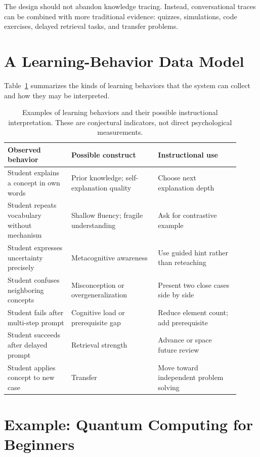 \documentclass[11pt]{article}
\begin{document}
The design should not abandon knowledge tracing. Instead, conversational traces can be combined with more traditional evidence: quizzes, simulations, code exercises, delayed retrieval tasks, and transfer problems.

\section{A Learning-Behavior Data Model}

Table~\ref{tab:data-model} summarizes the kinds of learning behaviors that the system can collect and how they may be interpreted.

\begin{table}[H]
\centering
\small
\begin{tabular}{p{0.25\linewidth} p{0.34\linewidth} p{0.32\linewidth}}
\toprule
\textbf{Observed behavior} & \textbf{Possible construct} & \textbf{Instructional use} \\
\midrule
Student explains a concept in own words & Prior knowledge; self-explanation quality & Choose next explanation depth \\
Student repeats vocabulary without mechanism & Shallow fluency; fragile understanding & Ask for contrastive example \\
Student expresses uncertainty precisely & Metacognitive awareness & Use guided hint rather than reteaching \\
Student confuses neighboring concepts & Misconception or overgeneralization & Present two close cases side by side \\
Student fails after multi-step prompt & Cognitive load or prerequisite gap & Reduce element count; add prerequisite \\
Student succeeds after delayed prompt & Retrieval strength & Advance or space future review \\
Student applies concept to new case & Transfer & Move toward independent problem solving \\
\bottomrule
\end{tabular}
\caption{Examples of learning behaviors and their possible instructional interpretation. These are conjectural indicators, not direct psychological measurements.}
\label{tab:data-model}
\end{table}

\section{Example: Quantum Computing for Beginners}
\end{document}
